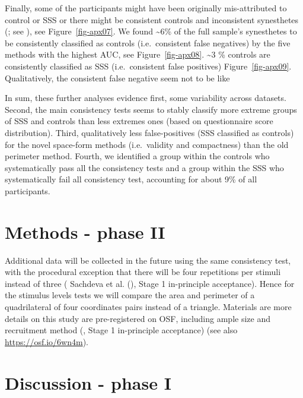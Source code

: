 \documentclass[
  man,
  floatsintext,
  longtable,
  a4paper,
  nolmodern,
  notxfonts,
  notimes,
  colorlinks=true,linkcolor=blue,citecolor=blue,urlcolor=blue]{apa7}
\begin{document}
Finally, some of the participants might have been originally
mis-attributed to control or SSS or there might be consistent controls
and inconsistent synesthetes (; see ), see
Figure~\ref{fig-apx07}. We found \textasciitilde6\% of the full sample's
synesthetes to be consistently classified as controls (i.e.~consistent
false negatives) by the five methods with the highest AUC, see
Figure~\ref{fig-apx08}. \textasciitilde3 \% controls are consistently
classified as SSS (i.e.~consistent false positives)
Figure~\ref{fig-apx09}. Qualitatively, the consistent false negative
seem not to be like

In sum, these further analyses evidence first, some variability across
datasets. Second, the main consistency tests seems to stably classify
more extreme groups of SSS and controls than less extremes ones (based
on questionnaire score distribution). Third, qualitatively less
false-positives (SSS classified as controls) for the novel space-form
methods (i.e.~validity and compactness) than the old perimeter method.
Fourth, we identified a group within the controls who systematically
pass all the consistency tests and a group within the SSS who
systematically fail all consistency test, accounting for about 9\% of
all participants.

\section{Methods - phase II}\label{sec-phase-ii-methods}

Additional data will be collected in the future using the same
consistency test, with the procedural exception that there will be four
repetitions per stimuli instead of three ( Sachdeva et al.
(), Stage 1 in-principle acceptance).
Hence for the stimulus levels tests we will compare the area and
perimeter of a quadrilateral of four coordinates pairs instead of a
triangle. Materials are more details on this study are pre-registered on
OSF, including ample size and recruitment method
(, Stage 1
in-principle acceptance) (see also \url{https://osf.io/6wn4m}).

\section{Discussion - phase I}\label{discussion---phase-i}
\end{document}
